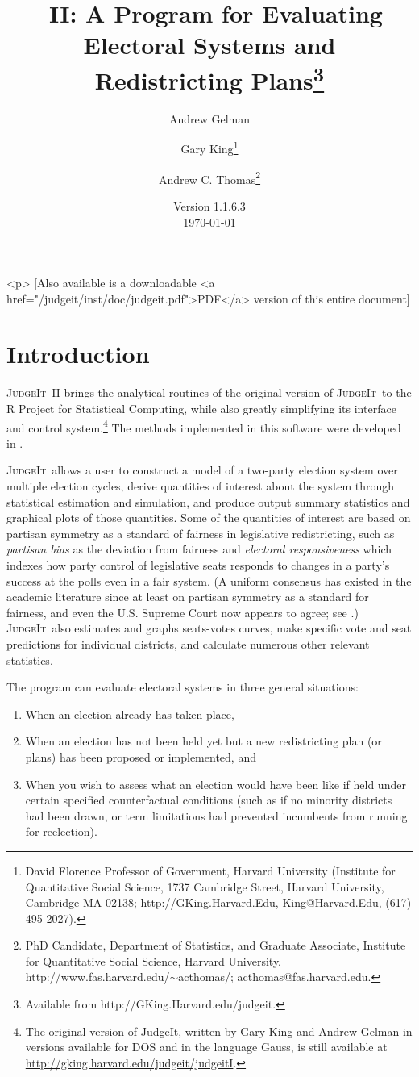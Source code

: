 \documentclass[oneside,letterpaper,titlepage]{article}
\title{\JudgeIt~II: A Program for Evaluating Electoral Systems and
  Redistricting Plans\thanks{Available from
    http://GKing.Harvard.edu/judgeit.}}
\author{Andrew Gelman \and Gary King\thanks{David Florence Professor
    of Government, Harvard University (Institute for Quantitative
    Social Science, 1737 Cambridge Street, Harvard University,
    Cambridge MA 02138; http://GKing.Harvard.Edu, King@Harvard.Edu,
    (617) 495-2027).}  \and %
  Andrew C. Thomas\thanks{PhD Candidate, Department of Statistics, and Graduate Associate, Institute for Quantitative Social Science, Harvard University. http://www.fas.harvard.edu/$\sim$acthomas/; acthomas@fas.harvard.edu.}}
\date{Version 1.1.6.3\\ \today}
\newcommand{\JudgeIt}{\textsc{JudgeIt}\ }
\begin{document}
\maketitle

\begin{rawhtml}
  <p> [Also available is a downloadable <a
  href="/judgeit/inst/doc/judgeit.pdf">PDF</a> version of this entire document]
\end{rawhtml}

\tableofcontents
\clearpage

\section{Introduction}

\JudgeIt II brings the analytical routines of the original version of
\JudgeIt to the R Project for Statistical Computing, while also greatly
simplifying its interface and control system.\footnote{The original
  version of JudgeIt, written by Gary King and Andrew Gelman in
  versions available for DOS and in the language Gauss, is still
  available at \url{http://gking.harvard.edu/judgeit/judgeitI}.}  The
methods implemented in this software were developed in
\citet{GelKin90,GelKin90b,GelKin94a,GelKin94b,KinGel91,GelKatKin04}.

\JudgeIt allows a user to construct a model of a two-party election
system over multiple election cycles, derive quantities of interest
about the system through statistical estimation and simulation, and
produce output summary statistics and graphical plots of those
quantities.  Some of the quantities of interest are based on partisan
symmetry as a standard of fairness in legislative redistricting, such
as \emph{partisan bias} as the deviation from fairness and
\emph{electoral responsiveness} which indexes how party control of
legislative seats responds to changes in a party's success at the
polls even in a fair system.  (A uniform consensus has existed in the
academic literature since at least \citet{KinBro87} on partisan
symmetry as a standard for fairness, and even the U.S.  Supreme Court
now appears to agree; see \citealt{GroKin07}.)  \JudgeIt also estimates
and graphs seats-votes curves, make specific vote and seat
predictions for individual districts, and calculate numerous other
relevant statistics.

The program can evaluate electoral systems in three general situations:
\begin{enumerate}
\item When an election already has taken place,
\item When an election has not been held yet but a new redistricting
  plan (or plans) has been proposed or implemented, and
\item When you wish to assess what an election would have been like if
  held under certain specified counterfactual conditions (such as if
  no minority districts had been drawn, or term limitations had
  prevented incumbents from running for reelection).
\end{enumerate}
\end{document}
